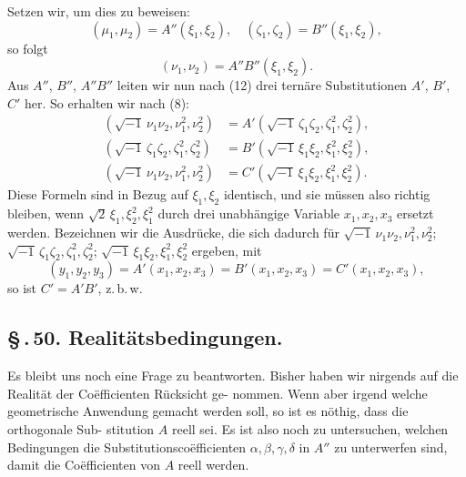 \documentclass[12pt,a4paper]{article}
\theoremstyle{plain}
\theoremstyle{definition}
\theoremstyle{remark}
\newcommand{\sect}[1]{\S\,.\,#1.}
\begin{document}
Setzen wir, um dies zu beweisen:
\begin{equation}\label{eq:49_23}
(\mu_1, \mu_2) = A''(\xi_1, \xi_2),\quad (\zeta_1, \zeta_2) = B''(\xi_1, \xi_2),\tag{23}
\end{equation}
so folgt
\begin{equation}\label{eq:49_24}
(\nu_1, \nu_2) = A''B''(\xi_1, \xi_2).\tag{24}
\end{equation}
Aus $A''$, $B''$, $A''B''$ leiten wir nun nach (12) drei tern\"are
Substitutionen $A'$, $B'$, $C'$ her. So erhalten wir nach (8):
\begin{equation}\label{eq:49_25}
\begin{aligned}
(\sqrt{-1}\,\nu_1\nu_2, \nu_1^2, \nu_2^2) &= A'(\sqrt{-1}\,\zeta_1\zeta_2, \zeta_1^2, \zeta_2^2),\\
(\sqrt{-1}\,\zeta_1\zeta_2, \zeta_1^2, \zeta_2^2) &= B'(\sqrt{-1}\,\xi_1\xi_2, \xi_1^2, \xi_2^2),\\
(\sqrt{-1}\,\nu_1\nu_2, \nu_1^2, \nu_2^2) &= C'(\sqrt{-1}\,\xi_1\xi_2, \xi_1^2, \xi_2^2).
\end{aligned}\tag{25}
\end{equation}
Diese Formeln sind in Bezug auf $\xi_1, \xi_2$ identisch, und sie
m\"ussen also richtig bleiben, wenn $\sqrt{2}\,\xi_1, \xi_2^2, \xi_1^2$ durch drei
unabh\"angige Variable $x_1, x_2, x_3$ ersetzt werden. Bezeichnen wir
die Ausdr\"ucke, die sich dadurch f\"ur $\sqrt{-1}\,\nu_1\nu_2, \nu_1^2, \nu_2^2$; $\sqrt{-1}\,\zeta_1\zeta_2, \zeta_1^2, \zeta_2^2$; $\sqrt{-1}\,\xi_1\xi_2, \xi_1^2, \xi_2^2$
ergeben, mit
\begin{equation}\label{eq:49_26}
(y_1, y_2, y_3) = A'(x_1, x_2, x_3) = B'(x_1, x_2, x_3) = C'(x_1, x_2, x_3),\tag{26}
\end{equation}
so ist $C' = A'B'$, z.\,b.\,w.


\subsection*{\sect{50} Realit\"atsbedingungen.}

Es bleibt uns noch eine Frage zu beantworten. Bisher haben
wir nirgends auf die Realit\"at der Co\"efficienten R\"ucksicht ge-
nommen. Wenn aber irgend welche geometrische Anwendung
gemacht werden soll, so ist es n\"othig, dass die orthogonale Sub-
stitution $A$ reell sei. Es ist also noch zu untersuchen, welchen
Bedingungen die Substitutionsco\"efficienten $\alpha, \beta, \gamma, \delta$ in $A''$ zu
unterwerfen sind, damit die Co\"efficienten von $A$ reell werden.
\end{document}
